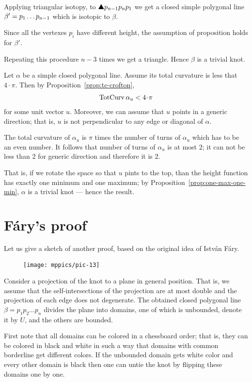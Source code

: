 Applying triangular isotopy, to $\solidtriangle p_{n-1}p_np_1$ we get a closed simple polygonal line $\beta'\z=p_1\dots p_{n-1}$ which is isotopic to $\beta$.

Since all the vertexes $p_i$ have different height,
the assumption of proposition holds for $\beta'$.

Repeating this procedure $n-3$ times we get a triangle.
Hence $\beta$ is a trivial knot.
\qeds

Let $\alpha$ be a simple closed polygonal line.
Assume its total curvature is less that $4\cdot\pi$.
Then by Proposition~\ref{prop:tc-crofton}, 
\[\tc\alpha_u<4\cdot\pi\]
for some unit vector $u$.
Moreover, we can assume that $u$ points in a generic direction;
that is, $u$ is not perpendicular to any edge or diagonal of $\alpha$.

The total curvature of $\alpha_u$ is $\pi$ times the number of turns of $\alpha_u$
which has to be an even number.
It follows that number of turns of $\alpha_u$ is at most $2$;
it can not be less than 2 for generic direction and therefore it is $2$.

That is, if we rotate the space so that $u$ pints to the top,
than the height function has exactly one minimum and one maximum;
by Proposition~\ref{prop:one-max-one-min}, $\alpha$ is a trivial knot --- hence the result.
\qeds

\section{F\'ary's proof}

Let us give a sketch of another proof, based on the original idea of Istv\'an F\'ary.

\begin{figure}
\vskip-0mm
\centering
\texttt{[image: mppics/pic-13]}
\vskip0mm
\end{figure}

Consider a projection of the knot to a plane in general position.
That is, we assume that the self-intersections of the projection are at most double and the projection of each edge does not degenerate.
The obtained closed polygonal line $\beta=p_1p_2\dots p_n$ divides the plane into domains, one of which is unbounded, denote it by $U$, and the others are bounded.

First note that all domains can be colored in a chessboard order;
that is, they can be colored in black and white in such a way that domains with common borderline get different colors.
If the unbounded domain gets white color and every other domain is black then one can untie the knot by flipping these domains one by one.

